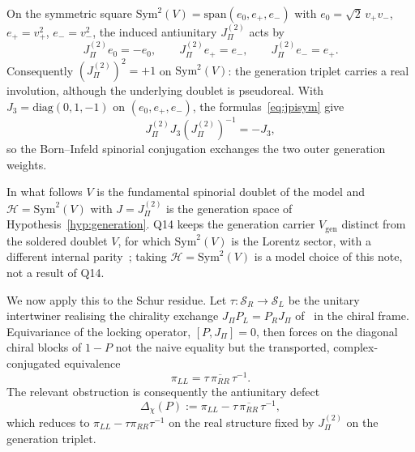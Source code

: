 \documentclass[11pt]{article}
\theoremstyle{definition}
\begin{document}
    On the symmetric square $\mathrm{Sym}^2(V)=\mathrm{span}(e_0,e_+,e_-)$ with $e_0=\sqrt{2}\,v_+v_-$,
    $e_+=v_+^2$, $e_-=v_-^2$, the induced antiunitary $J_\Pi^{(2)}$ acts by
    \begin{equation}
      \label{eq:jpisym}
      J_\Pi^{(2)}e_0=-e_0,\qquad J_\Pi^{(2)}e_+=e_-,\qquad J_\Pi^{(2)}e_-=e_+.
    \end{equation}
    Consequently $(J_\Pi^{(2)})^2=+1$ on $\mathrm{Sym}^2(V)$: the generation triplet carries a real
    involution, although the underlying doublet is pseudoreal.
    With $J_3=\mathrm{diag}(0,1,-1)$ on $(e_0,e_+,e_-)$, the formulas~\eqref{eq:jpisym} give
    \begin{equation}
      \label{eq:jpij3}
      J_\Pi^{(2)}J_3(J_\Pi^{(2)})^{-1}=-J_3,
    \end{equation}
    so the Born--Infeld spinorial conjugation exchanges the two outer generation weights.

    In what follows $V$ is the fundamental spinorial doublet of the model and $\mathcal H=\mathrm{Sym}^2(V)$ with
    $J=J_\Pi^{(2)}$ is the generation space of Hypothesis~\ref{hyp:generation}.
    Q14 keeps the generation carrier $V_{\mathrm{gen}}$ distinct from the soldered doublet $V$, for which
      $\mathrm{Sym}^2(V)$
    is the Lorentz sector, with a different internal parity~\cite{Beau2026q14}; taking $\mathcal H=\mathrm{Sym}^2(V)$
      is a
    model choice of this note, not a result of Q14.

    We now apply this to the Schur residue.
    Let $\tau:\mathcal S_R\to\mathcal S_L$ be the unitary intertwiner realising the chirality exchange
    $J_\Pi P_L=P_R J_\Pi$ of~\cite{Beau2026q14} in the chiral frame.
    Equivariance of the locking operator, $[P,J_\Pi]=0$, then forces on the diagonal chiral blocks of
    $1-P$ not the naive equality but the transported, complex-conjugated equivalence
    \begin{equation}
      \label{eq:transported}
      \pi_{LL}=\tau\,\overline{\pi_{RR}}\,\tau^{-1}.
    \end{equation}
    The relevant obstruction is consequently the antiunitary defect
    \begin{equation}
      \label{eq:defect}
      \Delta_\chi(P):=\pi_{LL}-\tau\,\overline{\pi_{RR}}\,\tau^{-1},
    \end{equation}
    which reduces to $\pi_{LL}-\tau\pi_{RR}\tau^{-1}$ on the real structure fixed by $J_\Pi^{(2)}$ on the
    generation triplet.
\end{document}
